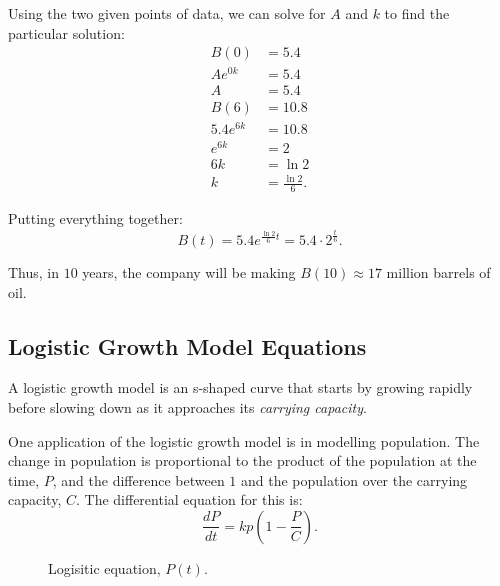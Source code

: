 \begin{enumerate}
	Using the two given points of data, we can solve for $A$ and $k$ to find the particular solution:
	\begin{align*}
		B(0) &= 5.4 \\
		A e^{0k} &= 5.4 \\
		A &= 5.4 \\[12pt]
		B(6) &= 10.8 \\
		5.4 e^{6k} &= 10.8 \\
		e^{6k} &= 2 \\
		6k &= \ln 2 \\
		k &= \frac{\ln 2}{6}.
	\end{align*}

	Putting everything together:
	\[ B(t) = 5.4 e^{\frac{\ln 2}{6} t} = 5.4 \cdot 2^{\frac{t}{6}}. \]

	Thus, in $10$ years, the company will be making $B(10) \approx 17$ million barrels of oil.
\end{enumerate}

\subsection{Logistic Growth Model Equations}
A logistic growth model is an s-shaped curve that starts by growing rapidly before slowing down as it approaches its \textit{carrying capacity}.

One application of the logistic growth model is in modelling population. The change in population is proportional to the product of the population at the time, $P$, and the difference between $1$ and the population over the carrying capacity, $C$. The differential equation for this is:
\[ \frac{dP}{dt} = kp \left( 1 - \frac{P}{C} \right). \]

\begin{figure}[H]
	\centering
	\caption{Logisitic equation, $P(t)$.}
\end{figure}

